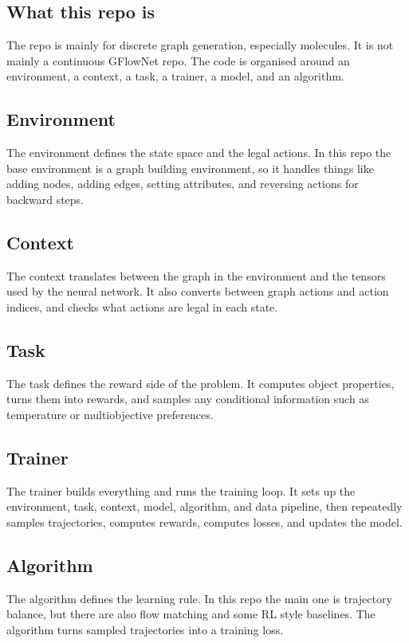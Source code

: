\documentclass{article}
\begin{document}
\subsection{What this repo is}
The repo is mainly for discrete graph generation, especially molecules. It is not mainly a continuous GFlowNet repo. The code is organised around an environment, a context, a task, a trainer, a model, and an algorithm.

\subsection{Environment}
The environment defines the state space and the legal actions. In this repo the base environment is a graph building environment, so it handles things like adding nodes, adding edges, setting attributes, and reversing actions for backward steps.

\subsection{Context}
The context translates between the graph in the environment and the tensors used by the neural network. It also converts between graph actions and action indices, and checks what actions are legal in each state.

\subsection{Task}
The task defines the reward side of the problem. It computes object properties, turns them into rewards, and samples any conditional information such as temperature or multiobjective preferences.

\subsection{Trainer}
The trainer builds everything and runs the training loop. It sets up the environment, task, context, model, algorithm, and data pipeline, then repeatedly samples trajectories, computes rewards, computes losses, and updates the model.

\subsection{Algorithm}
The algorithm defines the learning rule. In this repo the main one is trajectory balance, but there are also flow matching and some RL style baselines. The algorithm turns sampled trajectories into a training loss.
\end{document}
